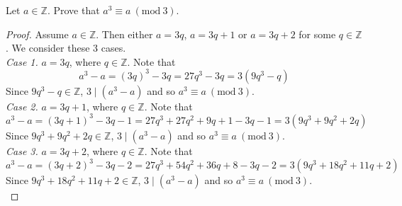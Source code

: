 \documentclass[12pt]{article}
\newcommand{\Z}{\mathbb{Z}}
\newcommand{\Mod}[1]{\ (\mathrm{mod}\ #1)}
\newenvironment{problem}[2][Problem]{\begin{trivlist}
		\item[\hskip \labelsep {\bfseries #1}\hskip \labelsep {\bfseries #2.}]}{\end{trivlist}}
\begin{document}
	\begin{problem}{21}
		Let $a\in \Z$. Prove that $a^{3} \equiv a \Mod 3$.
		\begin{proof}
			Assume $a\in \Z$. Then either $a=3q$, $a=3q+1$ or $a=3q+2$ for some $q\in \Z$. We consider these 3 cases.\\
			\textit{Case 1.} $a=3q$, where $q\in \Z$. Note that
			\begin{equation*}
				a^{3} - a = (3q)^{3}-3q=27q^{3}-3q=3(9q^{3}-q)
			\end{equation*}
			Since $9q^{3}-q\in \Z$, $3\mid (a^{3}-a)$ and so $a^{3} \equiv a \Mod 3$.\\
			\textit{Case 2.} $a=3q+1$, where $q\in \Z$. Note that
			\begin{equation*}
				a^{3}-a = (3q+1)^{3}-3q-1=27q^{3}+27q^{2}+9q+1-3q-1=3(9q^{3}+9q^{2}+2q)
			\end{equation*}
			Since $9q^{3}+9q^{2}+2q \in \Z$, $3\mid (a^{3}-a)$ and so $a^{3} \equiv a \Mod 3$.\\
			\textit{Case 3.} $a=3q+2$, where $q\in \Z$. Note that 
			\begin{equation*}
				a^{3}-a = (3q+2)^{3}-3q-2 = 27q^{3}+54q^{2}+36q+8 -3q -2  = 3(9q^{3}+18q^{2}+11q+2)
			\end{equation*}
			Since $9q^{3}+18q^{2}+11q+2 \in \Z$, $3\mid (a^{3}-a)$ and so $a^{3} \equiv a \Mod 3$.\\
		\end{proof}
	\end{problem}
\end{document}
